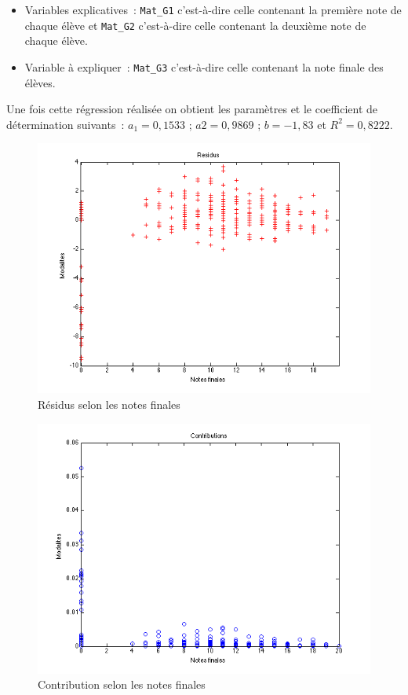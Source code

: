 \documentclass[11pt]{article}
\begin{document}
\begin{itemize}
\item Variables explicatives : \texttt{Mat\_G1} c'est-à-dire celle contenant la première note de chaque élève et \texttt{Mat\_G2} c'est-à-dire celle contenant la deuxième note de chaque élève.
\item Variable à expliquer : \texttt{Mat\_G3} c'est-à-dire celle contenant la note finale des élèves.
\end{itemize}

Une fois cette régression réalisée on obtient les paramètres et le coefficient de détermination suivants : $a_1=0,1533$ ; $a2=0,9869$ ; $b=-1,83$ et $R^2=0,8222$.

\begin{figure}[h]
\centering
\includegraphics[scale=0.4]{Images/fig20.png}
\caption{Résidus selon les notes finales}
\end{figure}

\begin{figure}[h]
\centering
\includegraphics[scale=0.4]{Images/fig21.png}
\caption{Contribution selon les notes finales}
\end{figure}\FloatBarrier
\end{document}
